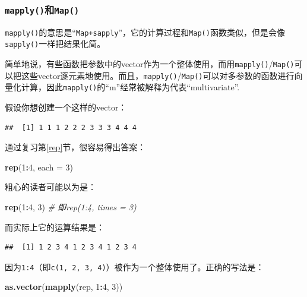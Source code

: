 \documentclass[]{book}
\newenvironment{Shaded}{\begin{snugshade}}{\end{snugshade}}
\newcommand{\CommentTok}[1]{\textcolor[rgb]{0.56,0.35,0.01}{\textit{#1}}}
\newcommand{\DataTypeTok}[1]{\textcolor[rgb]{0.13,0.29,0.53}{#1}}
\newcommand{\DecValTok}[1]{\textcolor[rgb]{0.00,0.00,0.81}{#1}}
\newcommand{\KeywordTok}[1]{\textcolor[rgb]{0.13,0.29,0.53}{\textbf{#1}}}
\newcommand{\NormalTok}[1]{#1}
\newcommand{\OperatorTok}[1]{\textcolor[rgb]{0.81,0.36,0.00}{\textbf{#1}}}
\begin{document}
\hypertarget{mapplymap}{%
\subsubsection{\texorpdfstring{\texttt{mapply()}和\texttt{Map()}}{mapply()和Map()}}\label{mapplymap}}

\texttt{mapply()}的意思是``\texttt{Map+sapply}''，它的计算过程和\texttt{Map()}函数类似，但是会像\texttt{sapply()}一样把结果化简。

简单地说，有些函数把参数中的vector作为一个整体使用，而用\texttt{mapply()}/\texttt{Map()}可以把这些vector逐元素地使用。而且，\texttt{mapply()}/\texttt{Map()}可以对多参数的函数进行向量化计算，因此\texttt{mapply()}的``m''经常被解释为代表``multivariate''.

假设你想创建一个这样的vector：

\begin{verbatim}
##  [1] 1 1 1 2 2 2 3 3 3 4 4 4
\end{verbatim}

通过复习第\ref{rep}节，很容易得出答案：

\begin{Shaded}
\begin{Highlighting}[]
\KeywordTok{rep}\NormalTok{(}\DecValTok{1}\OperatorTok{:}\DecValTok{4}\NormalTok{, }\DataTypeTok{each =} \DecValTok{3}\NormalTok{)}
\end{Highlighting}
\end{Shaded}

粗心的读者可能以为是：

\begin{Shaded}
\begin{Highlighting}[]
\KeywordTok{rep}\NormalTok{(}\DecValTok{1}\OperatorTok{:}\DecValTok{4}\NormalTok{, }\DecValTok{3}\NormalTok{) }\CommentTok{# 即rep(1:4, times = 3)}
\end{Highlighting}
\end{Shaded}

而实际上它的运算结果是：

\begin{verbatim}
##  [1] 1 2 3 4 1 2 3 4 1 2 3 4
\end{verbatim}

因为\texttt{1:4}（即\texttt{c(1,\ 2,\ 3,\ 4)}）被作为一个整体使用了。正确的写法是：

\begin{Shaded}
\begin{Highlighting}[]
\KeywordTok{as.vector}\NormalTok{(}\KeywordTok{mapply}\NormalTok{(rep, }\DecValTok{1}\OperatorTok{:}\DecValTok{4}\NormalTok{, }\DecValTok{3}\NormalTok{))}
\end{Highlighting}
\end{Shaded}
\end{document}

